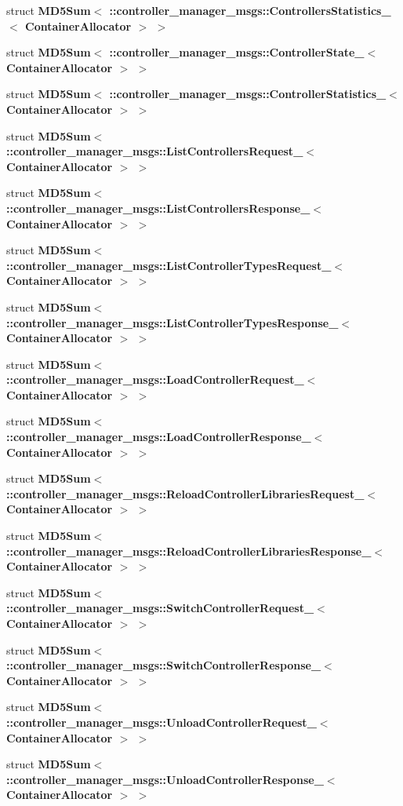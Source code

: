 \begin{DoxyCompactItemize}
\item 
struct {\bf \-M\-D5\-Sum$<$ \-::controller\-\_\-manager\-\_\-msgs\-::\-Controllers\-Statistics\-\_\-$<$ Container\-Allocator $>$ $>$}
\item 
struct {\bf \-M\-D5\-Sum$<$ \-::controller\-\_\-manager\-\_\-msgs\-::\-Controller\-State\-\_\-$<$ Container\-Allocator $>$ $>$}
\item 
struct {\bf \-M\-D5\-Sum$<$ \-::controller\-\_\-manager\-\_\-msgs\-::\-Controller\-Statistics\-\_\-$<$ Container\-Allocator $>$ $>$}
\item 
struct {\bf \-M\-D5\-Sum$<$ \-::controller\-\_\-manager\-\_\-msgs\-::\-List\-Controllers\-Request\-\_\-$<$ Container\-Allocator $>$ $>$}
\item 
struct {\bf \-M\-D5\-Sum$<$ \-::controller\-\_\-manager\-\_\-msgs\-::\-List\-Controllers\-Response\-\_\-$<$ Container\-Allocator $>$ $>$}
\item 
struct {\bf \-M\-D5\-Sum$<$ \-::controller\-\_\-manager\-\_\-msgs\-::\-List\-Controller\-Types\-Request\-\_\-$<$ Container\-Allocator $>$ $>$}
\item 
struct {\bf \-M\-D5\-Sum$<$ \-::controller\-\_\-manager\-\_\-msgs\-::\-List\-Controller\-Types\-Response\-\_\-$<$ Container\-Allocator $>$ $>$}
\item 
struct {\bf \-M\-D5\-Sum$<$ \-::controller\-\_\-manager\-\_\-msgs\-::\-Load\-Controller\-Request\-\_\-$<$ Container\-Allocator $>$ $>$}
\item 
struct {\bf \-M\-D5\-Sum$<$ \-::controller\-\_\-manager\-\_\-msgs\-::\-Load\-Controller\-Response\-\_\-$<$ Container\-Allocator $>$ $>$}
\item 
struct {\bf \-M\-D5\-Sum$<$ \-::controller\-\_\-manager\-\_\-msgs\-::\-Reload\-Controller\-Libraries\-Request\-\_\-$<$ Container\-Allocator $>$ $>$}
\item 
struct {\bf \-M\-D5\-Sum$<$ \-::controller\-\_\-manager\-\_\-msgs\-::\-Reload\-Controller\-Libraries\-Response\-\_\-$<$ Container\-Allocator $>$ $>$}
\item 
struct {\bf \-M\-D5\-Sum$<$ \-::controller\-\_\-manager\-\_\-msgs\-::\-Switch\-Controller\-Request\-\_\-$<$ Container\-Allocator $>$ $>$}
\item 
struct {\bf \-M\-D5\-Sum$<$ \-::controller\-\_\-manager\-\_\-msgs\-::\-Switch\-Controller\-Response\-\_\-$<$ Container\-Allocator $>$ $>$}
\item 
struct {\bf \-M\-D5\-Sum$<$ \-::controller\-\_\-manager\-\_\-msgs\-::\-Unload\-Controller\-Request\-\_\-$<$ Container\-Allocator $>$ $>$}
\item 
struct {\bf \-M\-D5\-Sum$<$ \-::controller\-\_\-manager\-\_\-msgs\-::\-Unload\-Controller\-Response\-\_\-$<$ Container\-Allocator $>$ $>$}
\end{DoxyCompactItemize}
